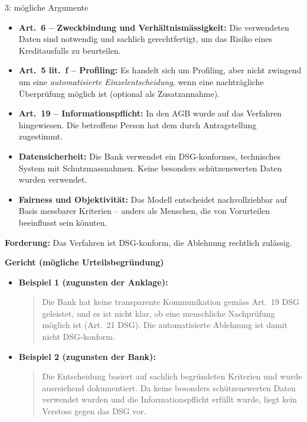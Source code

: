 \begin{aufgabe}{3: mögliche Argumente}
\begin{itemize}
  \item \textbf{Art.\ 6 – Zweckbindung und Verhältnismässigkeit:} Die verwendeten Daten sind notwendig und sachlich gerechtfertigt, um das Risiko eines Kreditausfalls zu beurteilen.
  \item \textbf{Art.\ 5 lit.\ f – Profiling:} Es handelt sich um Profiling, aber nicht zwingend um eine \emph{automatisierte Einzelentscheidung}, wenn eine nachträgliche Überprüfung möglich ist (optional als Zusatzannahme).
  \item \textbf{Art.\ 19 – Informationspflicht:} In den AGB wurde auf das Verfahren hingewiesen. Die betroffene Person hat dem durch Antragstellung zugestimmt.
  \item \textbf{Datensicherheit:} Die Bank verwendet ein DSG-konformes, technisches System mit Schutzmassnahmen. Keine besonders schützenswerten Daten wurden verwendet.
  \item \textbf{Fairness und Objektivität:} Das Modell entscheidet nachvollziehbar auf Basis messbarer Kriterien – anders als Menschen, die von Vorurteilen beeinflusst sein könnten.
\end{itemize}

\textbf{Forderung:} Das Verfahren ist DSG-konform, die Ablehnung rechtlich zulässig.

\vspace{0.5em}
\textbf{Gericht (mögliche Urteilsbegründung)}

\begin{itemize}
    \item \textbf{Beispiel 1 (zugunsten der Anklage):}
\begin{quote}
Die Bank hat keine transparente Kommunikation gemäss Art.\ 19 DSG geleistet, und es ist nicht klar, ob eine menschliche Nachprüfung möglich ist (Art.\ 21 DSG). Die automatisierte Ablehnung ist damit nicht DSG-konform.
\end{quote}
\item \textbf{Beispiel 2 (zugunsten der Bank):}
\begin{quote}
Die Entscheidung basiert auf sachlich begründeten Kriterien und wurde ausreichend dokumentiert. Da keine besonders schützenswerten Daten verwendet wurden und die Informationspflicht erfüllt wurde, liegt kein Verstoss gegen das DSG vor.
\end{quote}
\end{itemize}

\end{aufgabe}


